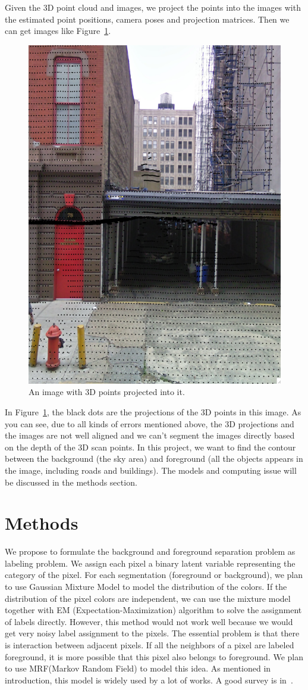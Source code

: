 \documentclass{article} %
\begin{document}
Given the 3D point cloud and images, we project the points into the
images with the estimated point positions, camera poses and projection
matrices. Then we can get images like Figure~\ref{fig-data_image}.

\begin{figure}[h]
\begin{center}
\includegraphics[height=0.5\linewidth]{./fig/image_sample.png}
\end{center}
\caption{An image with 3D points projected into it.}
\label{fig-data_image}
\end{figure}

In Figure~\ref{fig-data_image}, the black dots are the projections of
the 3D points in this image. As you can see, due to all kinds of
errors mentioned above, the 3D projections and the images are not well
aligned and we can't segment the images directly based on the depth of
the 3D scan points. In this project, we want to find the contour
between the background (the sky area) and foreground (all the objects
appears in the image, including roads and buildings). The models and
computing issue will be discussed in the methods section.

\section{Methods}

We propose to formulate the background and foreground separation
problem as labeling problem. We assign each pixel a binary latent
variable representing the category of the pixel. For each
segmentation (foreground or background), we plan to use Gaussian Mixture Model to model the
distribution of the colors. If the distribution of the pixel colors
are independent, we can use the mixture model together with EM
(Expectation-Maximization) algorithm to solve the assignment of labels
directly. However, this method would not work well because we would
get very noisy label assignment to the pixels. The essential problem
is that there is interaction between adjacent pixels. If all the
neighbors of a pixel are labeled foreground, it is more possible that
this pixel also belongs to foreground. We plan to
use MRF(Markov Random Field) to model this idea. As mentioned in
introduction, this model is widely used by a lot of works. A good
survey is in~\citep{Szeliski2008Comparative}.
\end{document}
